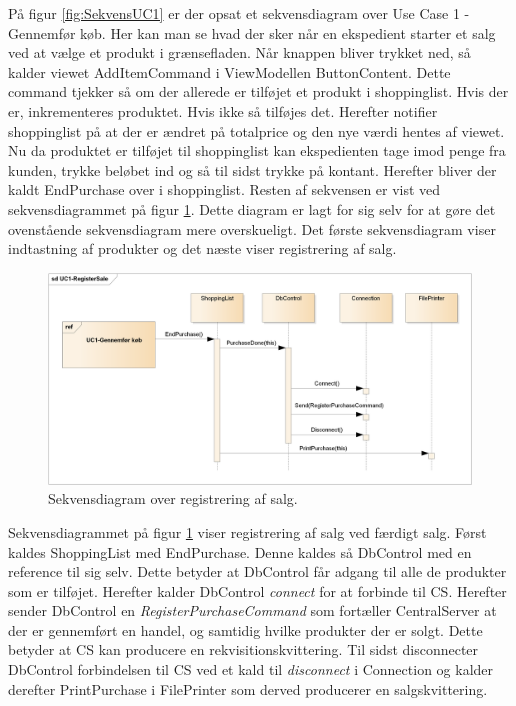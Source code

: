 På figur \ref{fig:SekvensUC1} er der opsat et sekvensdiagram over Use Case 1 - Gennemfør køb. Her kan man se hvad der sker når en ekspedient starter et salg ved at vælge et produkt i grænsefladen. Når knappen bliver trykket ned, så kalder viewet AddItemCommand i ViewModellen ButtonContent. Dette command tjekker så om der allerede er tilføjet et produkt i shoppinglist. Hvis der er, inkrementeres produktet. Hvis ikke så tilføjes det. Herefter notifier shoppinglist på at der er ændret på totalprice og den nye værdi hentes af viewet. \\
Nu da produktet er tilføjet til shoppinglist kan ekspedienten tage imod penge fra kunden, trykke beløbet ind og så til sidst trykke på kontant. Herefter bliver der kaldt EndPurchase over i shoppinglist. Resten af sekvensen er vist ved sekvensdiagrammet på figur \ref{fig:SekvensRegisterSale}. Dette diagram er lagt for sig selv for at gøre det ovenstående sekvensdiagram mere overskueligt. Det første sekvensdiagram viser indtastning af produkter og det næste viser registrering af salg.

\begin{figure}[H]
	\centering
	\includegraphics[width=1\textwidth]{Systemdesign/Frontend/GUI/DesignOgStruktur/Pics/RegisterSale}
	\caption{Sekvensdiagram over registrering af salg.}
	\label{fig:SekvensRegisterSale}
\end{figure}

Sekvensdiagrammet på figur \ref{fig:SekvensRegisterSale} viser registrering af salg ved færdigt salg. Først kaldes ShoppingList med EndPurchase. Denne kaldes så DbControl med en reference til sig selv. Dette betyder at DbControl får adgang til alle de produkter som er tilføjet. Herefter kalder DbControl \textit{connect} for at forbinde til \gls{CS}. Herefter sender DbControl en \textit{RegisterPurchaseCommand} som fortæller CentralServer at der er gennemført en handel, og samtidig hvilke produkter der er solgt. Dette betyder at \gls{CS} kan producere en rekvisitionskvittering. Til sidst disconnecter DbControl forbindelsen til \gls{CS} ved et kald til \textit{disconnect} i Connection og kalder derefter PrintPurchase i FilePrinter som derved producerer en salgskvittering.

